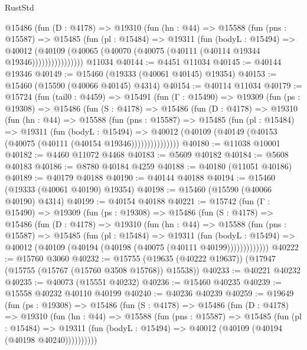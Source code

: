 \begin{lexlean}{RustStd}
\begin{coremodule}
            @15486
              (fun (D : @4178) =>
              @19310
                (fun (hn : @44) =>
                @15588
                  (fun (pns : @15587) =>
                  @15485
                    (fun (pl : @15484) =>
                    @19311
                      (fun (bodyL : @15494) =>
                      @40012
                        (@40109
                          (@40065 (@40070 (@40075 (@40111 (@40114 @19344 @19346))))))))))))))))
    @11034
@40144 := @4451 @11034
@40145 := @40144 @19346
@40149 := @15460 (@19333 (@40061 @40145) @19354)
@40153 := @15460 (@15590 (@40066 @40145) @4314)
@40154 := @40114 @11034
@40179 := @15724
    (fun (tail0 : @4459) =>
    @15491
      (fun (Γ : @15490) =>
      @19309
        (fun (ps : @19308) =>
        @15486
          (fun (S : @4178) =>
          @15486
            (fun (D : @4178) =>
            @19310
              (fun (hn : @44) =>
              @15588
                (fun (pns : @15587) =>
                @15485
                  (fun (pl : @15484) =>
                  @19311
                    (fun (bodyL : @15494) =>
                    @40012 (@40109 (@40149 (@40153 (@40075 (@40111 (@40154 @19346)))))))))))))))
@40180 := @11038 @10001
@40182 := @4460 @11072 @4468
@40183 := @5609 @40182
@40184 := @5608 @40183
@40186 := @8780 @40184 @4259
@40188 := @40180 (@11051 @40186)
@40189 := @40179 @40188
@40190 := @40144 @40188
@40194 := @15460 (@19333 (@40061 @40190) @19354)
@40198 := @15460 (@15590 (@40066 @40190) @4314)
@40199 := @40154 @40188
@40221 := @15742
    (fun (Γ : @15490) =>
    @19309
      (fun (ps : @19308) =>
      @15486
        (fun (S : @4178) =>
        @15486
          (fun (D : @4178) =>
          @19310
            (fun (hn : @44) =>
            @15588
              (fun (pns : @15587) =>
              @15485
                (fun (pl : @15484) =>
                @19311
                  (fun (bodyL : @15494) =>
                  @40012 (@40109 (@40194 (@40198 (@40075 (@40111 @40199)))))))))))))
@40222 := @15760 @3060
@40232 := @15755 (@19635 (@40222 @19637)) (@17947 (@15755 (@15767 (@15760 @3508 @15768)) @15538))
@40233 := @40221 @40232
@40235 := @40073 (@15551 @40232)
@40236 := @15460 @40235
@40239 := @15558 @40232 @40110 @40199
@40240 := @40236 @40239
@40259 := @19649
    (fun (ps : @19308) =>
    @15486
      (fun (S : @4178) =>
      @15486
        (fun (D : @4178) =>
        @19310
          (fun (hn : @44) =>
          @15588
            (fun (pns : @15587) =>
            @15485
              (fun (pl : @15484) =>
              @19311 (fun (bodyL : @15494) => @40012 (@40109 (@40194 (@40198 @40240))))))))))

\end{coremodule}
\end{lexlean}
